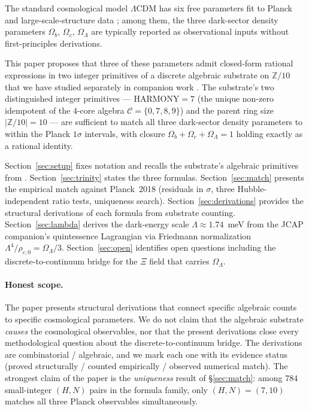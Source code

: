 \documentclass[11pt,reqno]{amsart}
\theoremstyle{plain}
\theoremstyle{definition}
\theoremstyle{remark}
\newcommand{\Z}{\mathbb{Z}}
\begin{document}
\medskip

The standard cosmological model $\Lambda$CDM has six free
parameters fit to Planck and large-scale-structure data
\cite{Planck2018}; among them, the three dark-sector density
parameters $\Omega_b$, $\Omega_c$, $\Omega_\Lambda$ are
typically reported as observational inputs without first-principles
derivations.

This paper proposes that three of these parameters admit closed-form
rational expressions in two integer primitives of a discrete
algebraic substrate on $\Z/10$ that we have studied separately
in companion work \cite{SandersGish2026FourCore,
SandersGish2026JCAP}. The substrate's two distinguished integer
primitives --- $\mathrm{HARMONY} = 7$ (the unique non-zero
idempotent of the $4$-core algebra $\mathcal{C} = \{0, 7, 8, 9\}$)
and the parent ring size $|\Z/10| = 10$ --- are sufficient to
match all three dark-sector density parameters to within the
Planck $1\sigma$ intervals, with closure
$\Omega_b + \Omega_c + \Omega_\Lambda = 1$ holding exactly as a
rational identity.

Section~\ref{sec:setup} fixes notation and recalls the substrate's
algebraic primitives from \cite{SandersGish2026FourCore,
SandersGish2026JCAP}. Section~\ref{sec:trinity} states
the three formulas. Section~\ref{sec:match} presents the empirical
match against Planck~2018 (residuals in $\sigma$, three
Hubble-independent ratio tests, uniqueness search).
Section~\ref{sec:derivations} provides the structural derivations
of each formula from substrate counting.
Section~\ref{sec:lambda} derives the dark-energy scale
$\Lambda \approx 1.74$~meV from the JCAP companion's
quintessence Lagrangian via Friedmann normalization
$\Lambda^{4}/\rho_{c,0} = \Omega_\Lambda/3$. Section~\ref{sec:open}
identifies open questions including the discrete-to-continuum
bridge for the $\Xi$ field that carries $\Omega_\Lambda$.

\paragraph{Honest scope.} The paper presents structural
derivations that connect specific algebraic counts to specific
cosmological parameters. We do not claim that the algebraic
substrate \emph{causes} the cosmological observables, nor that
the present derivations close every methodological question
about the discrete-to-continuum bridge. The derivations are
combinatorial / algebraic, and we mark each one with its evidence
status (proved structurally / counted empirically / observed
numerical match). The strongest claim of the paper is the
\emph{uniqueness} result of \S\ref{sec:match}: among $784$
small-integer $(H, N)$ pairs in the formula family, only
$(H, N) = (7, 10)$ matches all three Planck observables
simultaneously.
\end{document}
